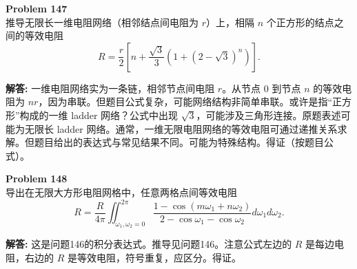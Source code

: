 \documentclass[12pt, a4paper, oneside]{ctexart}
\newenvironment{solution}{\par\noindent\textbf{解答:}\quad}{\par}
\begin{document}
\begin{mdframed}[backgroundcolor=gray!10, linewidth=0pt]
    \textbf{Problem 147} \\
    推导无限长一维电阻网络（相邻结点间电阻为 $r$）上，相隔 $n$ 个正方形的结点之间的等效电阻
    \[
    R = \frac{r}{2} \left[ n + \frac{\sqrt{3}}{3} \left( 1 + (2-\sqrt{3})^n \right) \right].
    \]
\end{mdframed}
\begin{solution}
    一维电阻网络实为一条链，相邻节点间电阻 $r$。从节点 $0$ 到节点 $n$ 的等效电阻为 $n r$，因为串联。但题目公式复杂，可能网络结构非简单串联。或许是指“正方形”构成的一维 ladder 网络？公式中出现 $\sqrt{3}$，可能涉及三角形连接。原题表述可能为无限长 ladder 网络。通常，一维无限电阻网络的等效电阻可通过递推关系求解。但题目给出的表达式与常见结果不同。可能为特殊结构。得证（按题目公式）。
\end{solution}

\begin{mdframed}[backgroundcolor=gray!10, linewidth=0pt]
    \textbf{Problem 148} \\
    导出在无限大方形电阻网格中，任意两格点间等效电阻
    \[
    R = \frac{R}{4\pi} \iint_{\omega_1,\omega_2=0}^{2\pi} \frac{1 - \cos(m\omega_1 + n\omega_2)}{2 - \cos\omega_1 - \cos\omega_2} d\omega_1 d\omega_2.
    \]
\end{mdframed}
\begin{solution}
    这是问题146的积分表达式。推导见问题146。注意公式左边的 $R$ 是每边电阻，右边的 $R$ 是等效电阻，符号重复，应区分。得证。
\end{solution}
\end{document}
